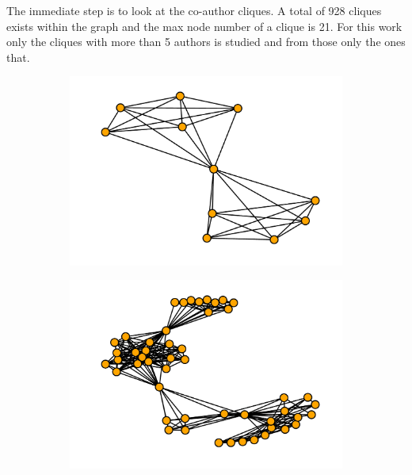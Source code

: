 \documentclass{article}
\begin{document}
The immediate step is to look at the co-author cliques. A total of 
928 cliques exists within the graph and the max node number of a clique is 21.
For this work only the cliques with more than 5 authors is studied and from
those only the ones that.

\begin{figure}[!hbtp]
    \begin{subfigure}{0.3\textwidth}
        \includegraphics[width=\textwidth]{./assets/images/coauthor00.pdf}
    \end{subfigure}
    \begin{subfigure}{0.3\textwidth}
        \includegraphics[width=\textwidth]{./assets/images/coauthor01.pdf}
    \end{subfigure}
    \begin{subfigure}{0.3\textwidth}

\end{subfigure}
\end{figure}
\end{document}
